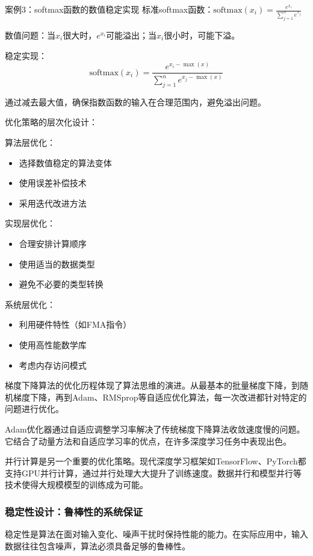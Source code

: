 案例3：softmax函数的数值稳定实现
标准softmax函数：$\text{softmax}(x_i) = \frac{e^{x_i}}{\sum_{j=1}^n e^{x_j}}$

数值问题：当$x_i$很大时，$e^{x_i}$可能溢出；当$x_i$很小时，可能下溢。

稳定实现：
$$\text{softmax}(x_i) = \frac{e^{x_i - \max(x)}}{\sum_{j=1}^n e^{x_j - \max(x)}}$$

通过减去最大值，确保指数函数的输入在合理范围内，避免溢出问题。

优化策略的层次化设计：

算法层优化：
\begin{itemize}
\item 选择数值稳定的算法变体
\item 使用误差补偿技术
\item 采用迭代改进方法
\end{itemize}

实现层优化：
\begin{itemize}
\item 合理安排计算顺序
\item 使用适当的数据类型
\item 避免不必要的类型转换
\end{itemize}

系统层优化：
\begin{itemize}
\item 利用硬件特性（如FMA指令）
\item 使用高性能数学库
\item 考虑内存访问模式
\end{itemize}

梯度下降算法的优化历程体现了算法思维的演进。从最基本的批量梯度下降，到随机梯度下降，再到Adam、RMSprop等自适应优化算法，每一次改进都针对特定的问题进行优化。

Adam优化器通过自适应调整学习率解决了传统梯度下降算法收敛速度慢的问题。它结合了动量方法和自适应学习率的优点，在许多深度学习任务中表现出色。

并行计算是另一个重要的优化策略。现代深度学习框架如TensorFlow、PyTorch都支持GPU并行计算，通过并行处理大大提升了训练速度。数据并行和模型并行等技术使得大规模模型的训练成为可能。

\subsubsection{稳定性设计：鲁棒性的系统保证}

稳定性是算法在面对输入变化、噪声干扰时保持性能的能力。在实际应用中，输入数据往往包含噪声，算法必须具备足够的鲁棒性。

